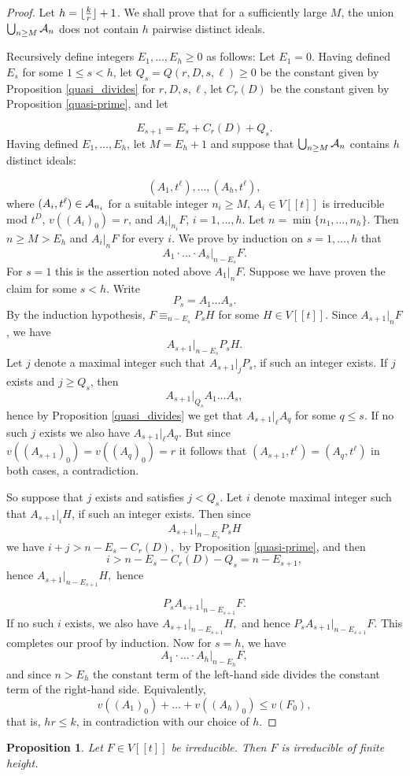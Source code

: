 \documentclass{article}
\theoremstyle{plain}
\newtheorem{proposition}[theorem]{Proposition}
\theoremstyle{definition}
\theoremstyle{remark}
\DeclarePairedDelimiter\floor{\lfloor}{\rfloor}
\theoremstyle{plain}
\begin{document}
\begin{proof}
    Let $h = \floor{\frac{k}{r}}+1$. We shall prove that for a sufficiently large $M$, the union $\bigcup_{n \geq M}{\cal{A}}_n$ does not contain $h$ pairwise distinct ideals. 
    
    Recursively define integers $E_1,\ldots,E_h \geq 0$ as follows: Let $E_1 = 0$. Having defined $E_s$ for some $1\leq s <h$, let $Q_s = Q(r,D,s,\ell) \geq 0$ be the constant given by Proposition \ref{quasi_divides} for $r,D,s,\ell$, let $C_r(D)$ be the constant given by Proposition \ref{quasi-prime}, and let 

    $$E_{s+1} = E_s+C_r(D)+Q_s.$$
Having defined $E_1,\ldots,E_h$, let $M = E_h+1$ and suppose that $\bigcup_{n \geq M} {\cal{A}}_n$ contains $h$ distinct ideals:

$$(A_1,t^\ell), \ldots,(A_h,t^\ell),$$
where $(A_i,t^\ell) \in {\cal{A}}_{n_i}$ for a suitable integer $n_i \geq M$,  $A_i \in V[[t]]$ is irreducible mod $t^D$, $v((A_i)_0) = r$, and $A_i|_{n_i} F$, $i = 1,\ldots,h$. Let $n = \min\{n_1,\ldots,n_h\}$. Then $n \geq M > E_h$ and $A_i|_n{F}$ for every $i$.   
We prove by induction on $s = 1,\ldots,h$ that 
$$A_1\cdot \ldots \cdot A_s |_{n-E_s} F.$$
For $s = 1$ this is the assertion noted above $A_1|_n F$. Suppose we have proven the claim for some $s < h$. Write $$P_s = A_1\ldots A_s.$$
By the induction hypothesis, $F \equiv_{n-E_s} P_sH$ for some $H \in V[[t]]$. Since $A_{s+1}|_{n}F$, we have $$A_{s+1}|_{n-E_s}P_sH.$$
Let $j$ denote a maximal integer such that $A_{s+1}|_jP_s$, if such an integer exists. If $j$ exists and $j \geq Q_s$, then  $$A_{s+1}|_{Q_s} A_1\ldots A_s,$$ hence by Proposition \ref{quasi_divides} we get that $A_{s+1}|_\ell A_q$ for some $q  \leq s$. If no such $j$ exists we also have $A_{s+1}|_\ell A_q$.  But since $v((A_{s+1})_0) = v((A_q)_0) = r$ it follows that $(A_{s+1},t^\ell) = (A_q,t^\ell)$ in both cases, a contradiction. 

So suppose that $j$ exists and satisfies $j < Q_s$. Let $i$ denote maximal integer such that $A_{s+1}|_i H$, if such an integer exists. Then since $$A_{s+1}|_{n-E_s} P_sH$$ we have $i+j > n - E_s- C_r(D),$ by Proposition \ref{quasi-prime}, and then 
$$i > n-E_s-C_r(D)- Q_s = n-E_{s+1},$$ 
hence $A_{s+1} |_{n-E_{s+1}} H,$ hence 

$$P_sA_{s+1}|_{n-E_{s+1}} F.$$
If no such $i$ exists, we also have $A_{s+1} |_{n-E_{s+1}} H,$ and hence $P_sA_{s+1}|_{n-E_{s+1}} F.$ This completes our proof by induction. Now for $s = h$, we have
    $$A_1\cdot \ldots \cdot A_h |_{n-E_h}F,$$ and since $n> E_h$ the constant term of the left-hand side divides the constant term of the right-hand side. Equivalently,
    $$v((A_1)_0)+\ldots+v((A_h)_0) \leq v(F_0),$$ that is, $hr \leq k$, in contradiction with our choice of $h$.
\end{proof}
\begin{proposition}
    \label{theorem_over_dvr} Let $F \in V[[t]]$ be irreducible. Then $F$ is irreducible of finite height.
\end{proposition}
\end{document}
